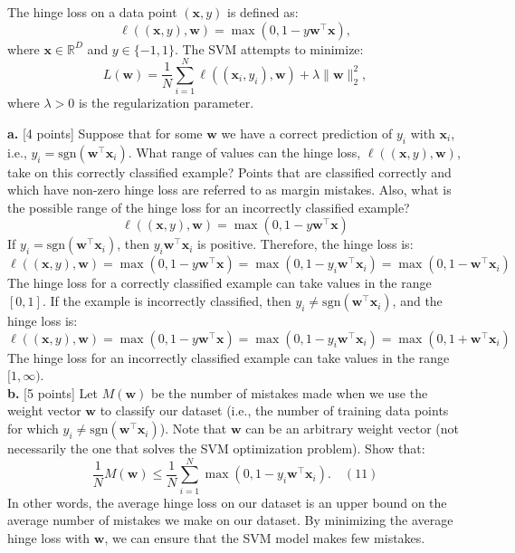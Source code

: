 \documentclass[a3paper,12pt]{extarticle} %
\begin{document}
The hinge loss on a data point $(\mathbf{x}, y)$ is defined as:
\[
\ell((\mathbf{x}, y), \mathbf{w}) = \max(0, 1 - y \mathbf{w}^\top \mathbf{x}),
\]
where $\mathbf{x} \in \mathbb{R}^D$ and $y \in \{-1, 1\}$. The SVM attempts to minimize:
\[
L(\mathbf{w}) = \frac{1}{N} \sum_{i=1}^N \ell((\mathbf{x}_i, y_i), \mathbf{w}) + \lambda \|\mathbf{w}\|_2^2,
\]
where $\lambda > 0$ is the regularization parameter.

\noindent \textbf{a.} [4 points] Suppose that for some \( \mathbf{w} \) we have a correct prediction of \( y_i \) with \( \mathbf{x}_i \), i.e., \( y_i = \text{sgn}(\mathbf{w}^\top \mathbf{x}_i) \). What range of values can the hinge loss, \( \ell((\mathbf{x}, y), \mathbf{w}) \), take on this correctly classified example? Points that are classified correctly and which have non-zero hinge loss are referred to as margin mistakes. Also, what is the possible range of the hinge loss for an incorrectly classified example?
\[
\ell((\mathbf{x}, y), \mathbf{w}) = \max(0, 1 - y \mathbf{w}^\top \mathbf{x})
\]
If \( y_i = \text{sgn}(\mathbf{w}^\top \mathbf{x}_i) \), then \( y_i \mathbf{w}^\top \mathbf{x}_i \) is positive. Therefore, the hinge loss is:
\[
\ell((\mathbf{x}, y), \mathbf{w}) = \max(0, 1 - y \mathbf{w}^\top \mathbf{x}) = \max(0, 1 - y_i \mathbf{w}^\top \mathbf{x}_i) = \max(0, 1 - \mathbf{w}^\top \mathbf{x}_i)
\]
The hinge loss for a correctly classified example can take values in the range \( [0, 1] \). If the example is incorrectly classified, then \( y_i \neq \text{sgn}(\mathbf{w}^\top \mathbf{x}_i) \), and the hinge loss is:
\[
\ell((\mathbf{x}, y), \mathbf{w}) = \max(0, 1 - y \mathbf{w}^\top \mathbf{x}) = \max(0, 1 - y_i \mathbf{w}^\top \mathbf{x}_i) = \max(0, 1 + \mathbf{w}^\top \mathbf{x}_i)
\]
The hinge loss for an incorrectly classified example can take values in the range \( [1, \infty) \).\\


\noindent \textbf{b.} [5 points] Let \( M(\mathbf{w}) \) be the number of mistakes made when we use the weight vector \( \mathbf{w} \) to classify our dataset (i.e., the number of training data points for which \( y_i \neq \text{sgn}(\mathbf{w}^\top \mathbf{x}_i) \)). Note that \( \mathbf{w} \) can be an arbitrary weight vector (not necessarily the one that solves the SVM optimization problem). Show that:
\[
\frac{1}{N} M(\mathbf{w}) \leq \frac{1}{N} \sum_{i=1}^N \max \left( 0, 1 - y_i \mathbf{w}^\top \mathbf{x}_i \right). \quad (11)
\]
In other words, the average hinge loss on our dataset is an upper bound on the average number of mistakes we make on our dataset. By minimizing the average hinge loss with \( \mathbf{w} \), we can ensure that the SVM model makes few mistakes.
\end{document}
